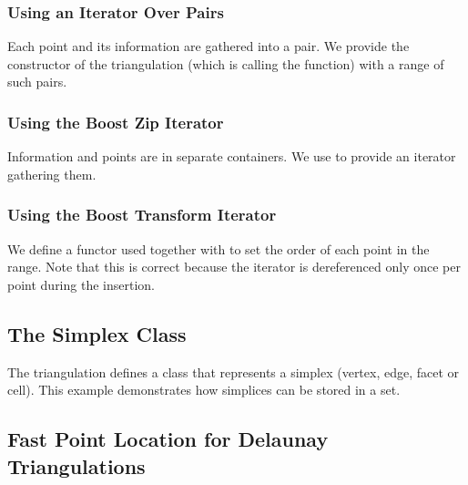 \subsubsection{Using an Iterator Over Pairs}
Each point and its information are gathered into a pair. We provide
the constructor of the triangulation (which is calling the  function)
with a range of such pairs.


\subsubsection{Using the Boost Zip Iterator}

Information and points are in separate containers. We use
{} to provide an iterator gathering them.


\subsubsection{Using the Boost Transform Iterator}

We define a functor  used together with
{} to set the order of each point
in the range. Note that this is correct because the iterator
is dereferenced only once per point during the insertion.


\subsection{The Simplex Class\label{Triangulation3-sec-simplex}}
The triangulation defines a  class that represents a
simplex (vertex, edge, facet or cell). This example demonstrates how
simplices can be stored in a set.



\subsection{Fast Point Location for Delaunay Triangulations\label{Triangulation3-ex-fast-location}}

